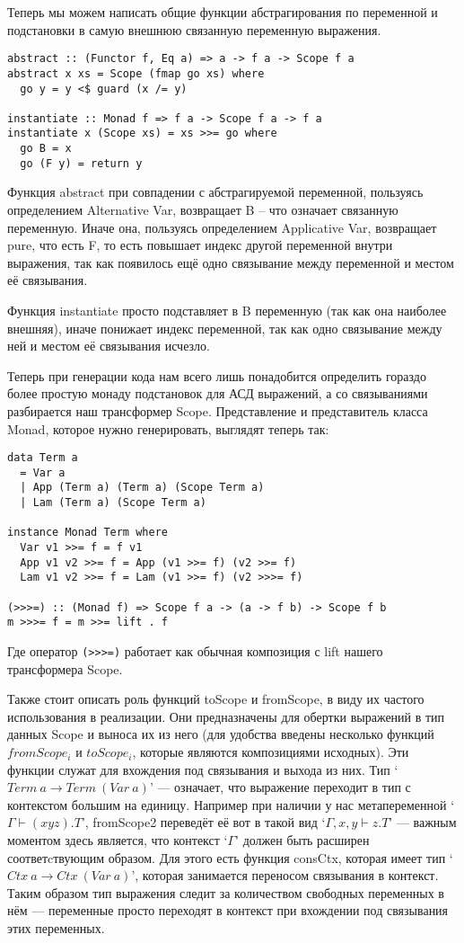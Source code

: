 Теперь мы можем написать общие функции абстрагирования по переменной и подстановки в самую внешнюю связанную переменную выражения.
\begin{lstlisting}[frame=single]
abstract :: (Functor f, Eq a) => a -> f a -> Scope f a
abstract x xs = Scope (fmap go xs) where
  go y = y <$ guard (x /= y)

instantiate :: Monad f => f a -> Scope f a -> f a
instantiate x (Scope xs) = xs >>= go where
  go B = x
  go (F y) = return y
\end{lstlisting}

Функция abstract при совпадении с абстрагируемой переменной, пользуясь определением Alternative Var, возвращает B -- что означает связанную переменную. Иначе она, пользуясь определением Applicative Var, возвращает pure, что есть F, то есть повышает индекс другой переменной внутри выражения, так как появилось ещё одно связывание между переменной и местом её связывания.

Функция instantiate просто подставляет в B переменную (так как она наиболее внешняя), иначе понижает индекс переменной, так как одно связывание между ней и местом её связывания исчезло.

Теперь при генерации кода нам всего лишь понадобится определить гораздо более простую монаду подстановок для АСД выражений, а со связываниями разбирается наш трансформер Scope. Представление и представитель класса Monad, которое нужно генерировать, выглядят теперь так:

\begin{lstlisting}[frame=single]
data Term a
  = Var a
  | App (Term a) (Term a) (Scope Term a)
  | Lam (Term a) (Scope Term a)

instance Monad Term where
  Var v1 >>= f = f v1
  App v1 v2 >>= f = App (v1 >>= f) (v2 >>= f)
  Lam v1 v2 >>= f = Lam (v1 >>= f) (v2 >>>= f)

(>>>=) :: (Monad f) => Scope f a -> (a -> f b) -> Scope f b
m >>>= f = m >>= lift . f
\end{lstlisting}

Где оператор \lstinline{(>>>=)} работает как обычная композиция с lift нашего трансформера Scope.

Также стоит описать роль функций toScope и fromScope, в виду их частого использования в реализации. Они предназначены для обертки выражений в тип данных Scope и выноса их из него (для удобства введены несколько функций $fromScope_i$ и $toScope_i$, которые являются композициями исходных). Эти функции служат для вхождения под связывания и выхода из них. Тип `$Term\ a \rightarrow Term\ (Var\ a)$' --- означает, что выражение переходит в тип с контекстом большим на единицу. Например при наличии у нас метапеременной `$\Gamma \vdash (x y z).T$', fromScope2 переведёт её вот в такой вид `$\Gamma, x, y \vdash z.T$' --- важным моментом здесь является, что контекст `$\Gamma$' должен быть расширен соответcтвующим образом. Для этого есть функция consCtx, которая имеет тип `$Ctx\ a \rightarrow Ctx\ (Var\ a)$', которая занимается переносом связывания в контекст. Таким образом тип выражения следит за количеством свободных переменных в нём --- переменные просто переходят в контекст при вхождении под связывания этих переменных.


